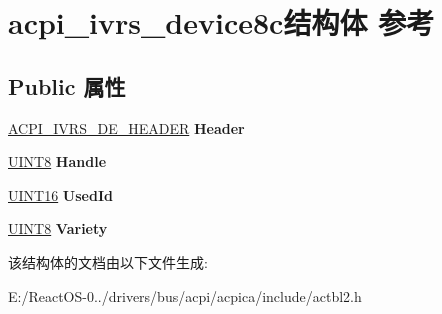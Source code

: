 \hypertarget{structacpi__ivrs__device8c}{}\section{acpi\+\_\+ivrs\+\_\+device8c结构体 参考}
\label{structacpi__ivrs__device8c}
\subsection*{Public 属性}
\begin{DoxyCompactItemize}
\item 
\mbox{\label{structacpi__ivrs__device8c_a1c28163d985eedbddd8d5d95f5321bf4}} 
\hyperlink{structacpi__ivrs__de__header}{A\+C\+P\+I\+\_\+\+I\+V\+R\+S\+\_\+\+D\+E\+\_\+\+H\+E\+A\+D\+ER} {\bfseries Header}
\item 
\mbox{\label{structacpi__ivrs__device8c_a56b45339b8f7f532d9b72ce6feac05a2}} 
\hyperlink{_processor_bind_8h_ab27e9918b538ce9d8ca692479b375b6a}{U\+I\+N\+T8} {\bfseries Handle}
\item 
\mbox{\label{structacpi__ivrs__device8c_a6d1275486f7b6d1ccd0e2b73e25959e1}} 
\hyperlink{_processor_bind_8h_a09f1a1fb2293e33483cc8d44aefb1eb1}{U\+I\+N\+T16} {\bfseries Used\+Id}
\item 
\mbox{\label{structacpi__ivrs__device8c_adfd995dd5bed898ed341e3b8a000d2e8}} 
\hyperlink{_processor_bind_8h_ab27e9918b538ce9d8ca692479b375b6a}{U\+I\+N\+T8} {\bfseries Variety}
\end{DoxyCompactItemize}


该结构体的文档由以下文件生成\+:\begin{DoxyCompactItemize}
\item 
E\+:/\+React\+O\+S-\/0../drivers/bus/acpi/acpica/include/actbl2.\+h\end{DoxyCompactItemize}
